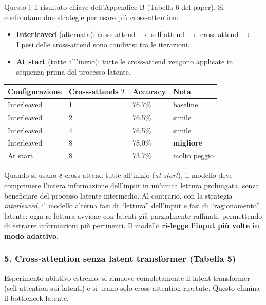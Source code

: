\documentclass[
  11pt,
]{article}
\begin{document}
Questo è il risultato chiave dell'Appendice B (Tabella 6 del paper). Si confrontano due strategie per usare più cross-attention:

\begin{itemize}
  \item \textbf{Interleaved} (alternata): cross-attend $\to$ self-attend $\to$ cross-attend $\to \ldots$ I pesi delle cross-attend sono condivisi tra le iterazioni.
  \item \textbf{At start} (tutte all'inizio): tutte le cross-attend vengono applicate in sequenza prima del processo latente.
\end{itemize}

{\small
\begin{longtable}{@{}p{4.5cm} p{3.5cm} p{2.5cm} p{1.5cm}@{}}
\toprule
\textbf{Configurazione} & \textbf{Cross-attends $T$} & \textbf{Accuracy} & \textbf{Nota} \\
\midrule
\endhead
Interleaved & 1  & 76.7\% & baseline \\[2pt]
Interleaved & 2  & 76.5\% & simile \\[2pt]
Interleaved & 4  & 76.5\% & simile \\[2pt]
Interleaved & 8  & 78.0\% & \textbf{migliore} \\[2pt]
At start    & 8  & 73.7\% & molto peggio \\[2pt]
\bottomrule
\end{longtable}
}

\begin{notabox}[title={\textbf{Interpretazione: perché interleaved batte ``at start''}}]
Quando si usano 8 cross-attend tutte all'inizio (\emph{at start}), il modello deve comprimere l'intera informazione dell'input in un'unica lettura prolungata, senza beneficiare del processo latente intermedio. Al contrario, con la strategia \emph{interleaved}, il modello alterna fasi di ``lettura'' dell'input e fasi di ``ragionamento'' latente: ogni re-lettura avviene con latenti già parzialmente raffinati, permettendo di estrarre informazioni più pertinenti. Il modello \textbf{ri-legge l'input più volte in modo adattivo}.
\end{notabox}

\subsubsection*{5. Cross-attention senza latent transformer (Tabella 5)}

Esperimento ablativo estremo: si rimuove completamente il latent transformer (self-attention sui latenti) e si usano solo cross-attention ripetute. Questo elimina il bottleneck latente.
\end{document}
